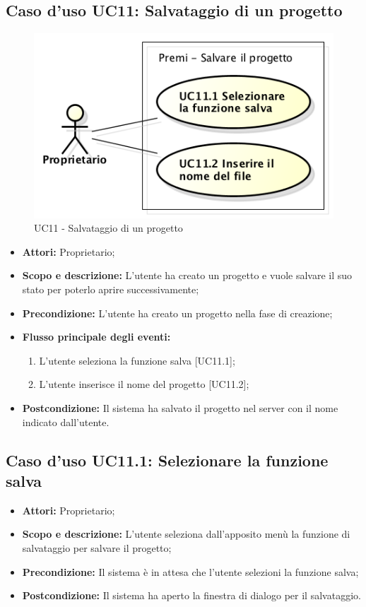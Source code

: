 \subsection{Caso d'uso UC11: Salvataggio di un progetto}
\begin{figure}[h] 
	\centering 
	\includegraphics[scale=0.45] {img/UC11.png}
	\caption{UC11 - Salvataggio di un progetto} 
\end{figure}

\begin{itemize}
	\item \textbf{Attori:} Proprietario;
	\item \textbf{Scopo e descrizione:} L'utente ha creato un progetto e vuole salvare il suo stato per poterlo aprire successivamente;
	\item \textbf{Precondizione:} L'utente ha creato un progetto nella fase di creazione;
	\item \textbf{Flusso principale degli eventi:}
	\begin{enumerate}
		\item L'utente seleziona la funzione salva [UC11.1];
		\item L'utente inserisce il nome del progetto [UC11.2];
	\end{enumerate}
	\item \textbf{Postcondizione:} Il sistema ha salvato il progetto nel server con il nome indicato dall'utente.
\end{itemize}


\subsection{Caso d'uso UC11.1: Selezionare la funzione salva}
\begin{itemize}
	\item \textbf{Attori:} Proprietario;
	\item \textbf{Scopo e descrizione:} L'utente seleziona dall'apposito menù la funzione di salvataggio per salvare il progetto;
	\item \textbf{Precondizione:} Il sistema è in attesa che l'utente selezioni la funzione salva;
	\item \textbf{Postcondizione:} Il sistema ha aperto la finestra di dialogo per il salvataggio.
\end{itemize}


